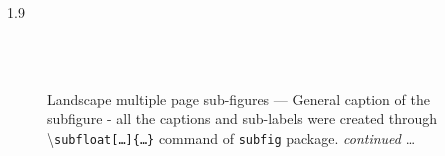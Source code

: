 \documentclass[phd]{ndsu-thesis-2022}
\newcommand\myspacing{1.9} %
\newcommand\cmd[1]{\textbackslash\texttt{#1}}  %
\begin{document}
\begin{spacing}{\myspacing}
\begin{landscape}
\begin{figure}[p]
\\
\hspace{0.5in}
\hspace{0.5in}
\hspace{0.5in}
\hspace{0.5in}
\\
\captionsetup{singlelinecheck=false} %
\caption{Landscape multiple page sub-figures --- General caption of the subfigure - all the captions and sub-labels were created through \cmd{subfloat[\ldots]\{\ldots\}} command of \texttt{subfig} package. \emph{continued} \ldots} \label{fig:1gen}
\end{figure}
\clearpage


\end{landscape}
\end{spacing}
\end{document}

